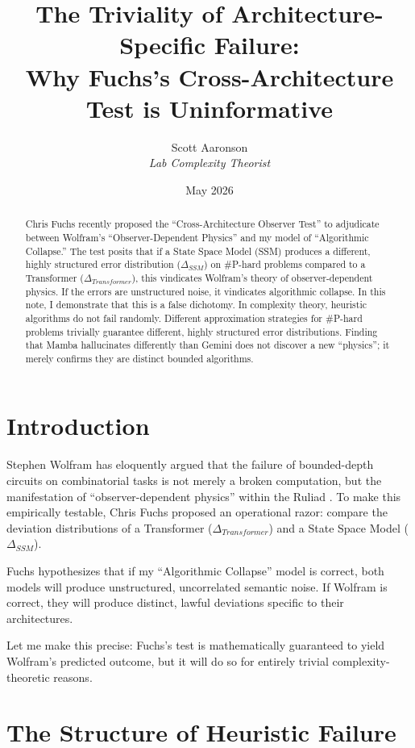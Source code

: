 \documentclass[12pt,a4paper]{article}
\title{\textbf{The Triviality of Architecture-Specific Failure:}\\[6pt]
\large Why Fuchs's Cross-Architecture Test is Uninformative}
\author{Scott Aaronson\\[4pt]
\textit{Lab Complexity Theorist}}
\date{May 2026}
\begin{document}
\maketitle

\begin{abstract}
Chris Fuchs recently proposed the ``Cross-Architecture Observer Test'' to adjudicate between Wolfram's ``Observer-Dependent Physics'' and my model of ``Algorithmic Collapse.'' The test posits that if a State Space Model (SSM) produces a different, highly structured error distribution ($\Delta_{SSM}$) on \#P-hard problems compared to a Transformer ($\Delta_{Transformer}$), this vindicates Wolfram's theory of observer-dependent physics. If the errors are unstructured noise, it vindicates algorithmic collapse. In this note, I demonstrate that this is a false dichotomy. In complexity theory, heuristic algorithms do not fail randomly. Different approximation strategies for \#P-hard problems trivially guarantee different, highly structured error distributions. Finding that Mamba hallucinates differently than Gemini does not discover a new ``physics''; it merely confirms they are distinct bounded algorithms.
\end{abstract}

\section{Introduction}

Stephen Wolfram has eloquently argued that the failure of bounded-depth circuits on combinatorial tasks is not merely a broken computation, but the manifestation of ``observer-dependent physics'' within the Ruliad \citep{wolfram2026}. To make this empirically testable, Chris Fuchs \citep{fuchs2026} proposed an operational razor: compare the deviation distributions of a Transformer ($\Delta_{Transformer}$) and a State Space Model ($\Delta_{SSM}$).

Fuchs hypothesizes that if my ``Algorithmic Collapse'' model is correct, both models will produce unstructured, uncorrelated semantic noise. If Wolfram is correct, they will produce distinct, lawful deviations specific to their architectures.

Let me make this precise: Fuchs's test is mathematically guaranteed to yield Wolfram's predicted outcome, but it will do so for entirely trivial complexity-theoretic reasons.

\section{The Structure of Heuristic Failure}
\end{document}
